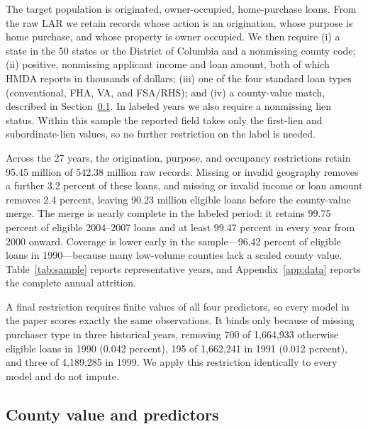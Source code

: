 \documentclass[letterpaper,12pt,usenames,dvipsnames]{article}
\theoremstyle{definition}
\begin{document}
The target population is originated, owner-occupied, home-purchase loans. From the raw LAR we
retain records whose action is an origination, whose purpose is home purchase, and whose
property is owner occupied. We then require (i) a state in the 50 states or the District of
Columbia and a nonmissing county code; (ii) positive, nonmissing applicant income and loan
amount, both of which HMDA reports in thousands of dollars; (iii) one of the four standard loan
types (conventional, FHA, VA, and FSA/RHS); and (iv) a county-value match, described in
Section~\ref{sec:data_predictors}. In labeled years we also require a nonmissing lien status.
Within this sample the reported field takes only the first-lien and subordinate-lien values, so
no further restriction on the label is needed.

Across the 27 years, the origination, purpose, and occupancy restrictions retain 95.45 million
of 542.38 million raw records. Missing or invalid geography removes a further 3.2 percent of
these loans, and missing or invalid income or loan amount removes 2.4 percent, leaving 90.23
million eligible loans before the county-value merge. The merge is nearly complete in the
labeled period: it retains 99.75 percent of eligible 2004--2007 loans and at least 99.47
percent in every year from 2000 onward. Coverage is lower early in the sample---96.42 percent
of eligible loans in 1990---because many low-volume counties lack a scaled county value.
Table~\ref{tab:sample} reports representative years, and Appendix~\ref{app:data} reports the
complete annual attrition.

A final restriction requires finite values of all four predictors, so every model in the paper
scores exactly the same observations. It binds only because of missing purchaser type in three
historical years, removing 700 of 1,664,933 otherwise eligible loans in 1990 (0.042 percent),
195 of 1,662,241 in 1991 (0.012 percent), and three of 4,189,285 in 1999. We apply this
restriction identically to every model and do not impute.

\subsection{County value and predictors}\label{sec:data_predictors}
\end{document}
